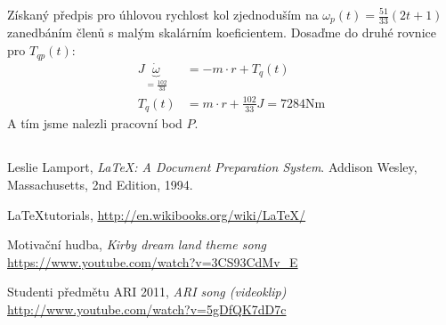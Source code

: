 \documentclass[twoside]{article}
\begin{document}
Získaný předpis pro úhlovou rychlost kol zjednoduším na $\omega_p(t) =  \frac{51}{33}(2t+1)$ zanedbáním členů s malým skalárním koeficientem.
Dosaďme do druhé rovnice pro $T_{qp}(t)$:
	\begin{equation}
		\begin{split}
			J \underbrace{\dot{\omega}}_{=\frac{102}{33}} &= -m \cdot r + T_q(t) \\
			T_q(t) &= m \cdot r + \frac{102}{33} J = 7284 \text{Nm}
		\end{split}
	\end{equation}
A tím jsme nalezli pracovní bod $P$.

\subsection{}
\subsection{}
\begin{thebibliography}{9}

  Leslie Lamport,
  \emph{\LaTeX: A Document Preparation System}.
  Addison Wesley, Massachusetts,
  2nd Edition,
  1994.

	\LaTeX tutorials, \url{http://en.wikibooks.org/wiki/LaTeX/}

	Motivační hudba, \emph{Kirby dream land theme song} \url{https://www.youtube.com/watch?v=3CS93CdMv_E}

	Studenti předmětu ARI 2011, \emph{ARI song (videoklip)} \url{http://www.youtube.com/watch?v=5gDfQK7dD7c}
\end{thebibliography}
\end{document}
